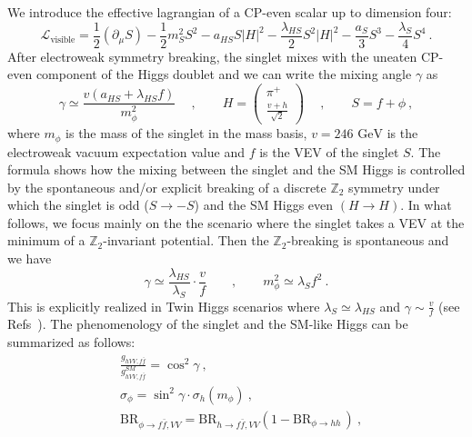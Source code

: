 We introduce the effective lagrangian of a CP-even scalar up to dimension four:
\begin{equation}
\mathcal{L}_{\text{visible}}=\frac{1}{2}(\partial_\mu S)-\frac{1}{2} m_S^2 S^2-a_{HS} S\vert H\vert^2-\frac{\lambda_{HS}}{2} S^2\vert H\vert^2-\frac{a_S}{3} S^3-\frac{\lambda_S}{4} S^4\ .\label{eq:everybody}
\end{equation}
After electroweak symmetry breaking, the singlet mixes with the uneaten CP-even component of the Higgs doublet and we can write the mixing angle $\gamma$ as
\begin{equation}
\gamma\simeq\frac{v(a_{HS}+\lambda_{HS} f)}{m_\phi^2}\quad\ ,\qquad H=\begin{pmatrix}\pi^+\\ \frac{v+h}{\sqrt{2}}\end{pmatrix}\quad\ ,\qquad S=f+\phi\ ,
\end{equation}   
where $m_\phi$ is the mass of the singlet in the mass basis, $v=246\text{ GeV}$ is the electroweak vacuum expectation value and $f$ is the VEV of the singlet $S$. The formula shows how the mixing between the singlet and the SM Higgs is controlled by the spontaneous and/or explicit breaking of a discrete $\mathbb{Z}_2$ symmetry under which the singlet is odd ($S\to -S$) and the SM Higgs even $(H\to H)$.  In what follows, we focus mainly on the the scenario where the singlet takes a VEV at the minimum of a $\mathbb{Z}_2$-invariant potential. Then the $\mathbb{Z}_2$-breaking is spontaneous and we have
\begin{equation}
\gamma\simeq \frac{\lambda_{HS}}{\lambda_S}\cdot\frac{v}{f}\qquad ,\qquad m_\phi^2\simeq \lambda_S f^2\ . \label{eq:mixing}
\end{equation} 
 This is explicitly realized in Twin Higgs scenarios where $\lambda_S\simeq \lambda_{HS}$ and $\gamma\sim \frac{v}{f}$ (see Refs~\cite{Chacko:2005pe,Barbieri:2005ri}). The phenomenology of the singlet and the SM-like Higgs can be summarized as follows:
\begin{align}
&\frac{g_{hVV,f\bar f}}{g_{hVV,f\bar f}^{SM}}=\cos^2\gamma \label{eq:SMHiggs}\ ,\\
&\sigma_\phi=\sin^2\gamma\cdot \sigma_{h}(m_\phi)\label{eq:Sproduction}\ ,\\
&\text{BR}_{\phi\to f\bar{f},VV}=\text{BR}_{h\to f\bar{f},VV}(1-\text{BR}_{\phi\to hh\ \label{eq:SBR}
})\ ,
\end{align}
